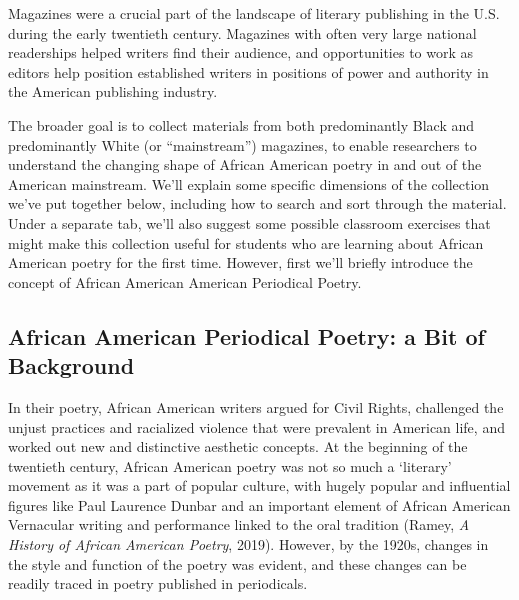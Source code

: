 \documentclass[
  letterpaper,
  DIV=11,
  numbers=noendperiod]{scrartcl}
\begin{document}
Magazines were a crucial part of the landscape of literary publishing in
the U.S. during the early twentieth century. Magazines with often very
large national readerships helped writers find their audience, and
opportunities to work as editors help position established writers in
positions of power and authority in the American publishing industry.

The broader goal is to collect materials from both predominantly Black
and predominantly White (or ``mainstream'') magazines, to enable
researchers to understand the changing shape of African American poetry
in and out of the American mainstream. We'll explain some specific
dimensions of the collection we've put together below, including how to
search and sort through the material. Under a separate tab, we'll also
suggest some possible classroom exercises that might make this
collection useful for students who are learning about African American
poetry for the first time. However, first we'll briefly introduce the
concept of African American American Periodical Poetry.

\subsection{African American Periodical Poetry: a Bit of
Background}\label{african-american-periodical-poetry-a-bit-of-background}

In their poetry, African American writers argued for Civil Rights,
challenged the unjust practices and racialized violence that were
prevalent in American life, and worked out new and distinctive aesthetic
concepts. At the beginning of the twentieth century, African American
poetry was not so much a `literary' movement as it was a part of popular
culture, with hugely popular and influential figures like Paul Laurence
Dunbar and an important element of African American Vernacular writing
and performance linked to the oral tradition (Ramey, \emph{A History of
African American Poetry}, 2019). However, by the 1920s, changes in the
style and function of the poetry was evident, and these changes can be
readily traced in poetry published in periodicals.
\end{document}
